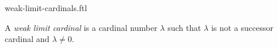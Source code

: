 \documentclass{naproche-library}
\begin{document}
\begin{smodule}[title=Weak Limit Cardinals]{weak-limit-cardinals.ftl}

\begin{definition}[forthel,id=SET_THEORY_06_8945210236547450]
  A \emph{weak limit cardinal} is a cardinal number $\lambda$ such that $\lambda$ is not a successor cardinal and $\lambda \neq 0$.
\end{definition}
\end{smodule}
\end{document}
